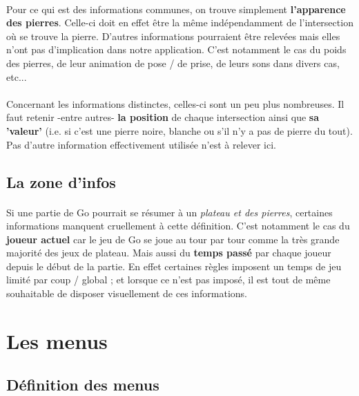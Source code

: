         	\paragraph{}Pour ce qui est des informations communes, on trouve simplement \textbf{l'apparence des pierres}. Celle-ci doit en effet être la même indépendamment de l'intersection où se trouve la pierre. D'autres informations pourraient être relevées mais elles n'ont pas d'implication dans notre application. C'est notamment le cas du poids des pierres, de leur animation de pose / de prise, de leurs sons dans divers cas, etc...        	
        	
        	\paragraph{}Concernant les informations distinctes, celles-ci sont un peu plus nombreuses. Il faut retenir -entre autres- \textbf{la position} de chaque intersection ainsi que \textbf{sa 'valeur'} (i.e. si c'est une pierre noire, blanche ou s'il n'y a pas de pierre du tout). Pas d'autre information effectivement utilisée n'est à relever ici.
        	
	    \subsection{La zone d'infos}
	        \paragraph{}Si une partie de Go pourrait se résumer à un \textit{plateau et des pierres}, certaines informations manquent cruellement à cette définition. C'est notamment le cas du \textbf{joueur actuel} car le jeu de Go se joue au tour par tour comme la très grande majorité des jeux de plateau. Mais aussi du \textbf{temps passé} par chaque joueur depuis le début de la partie. En effet certaines règles imposent un temps de jeu limité par coup / global ; et lorsque ce n'est pas imposé, il est tout de même souhaitable de disposer visuellement de ces informations.
	         
	         
    \section{Les menus}
        \subsection{Définition des menus}
